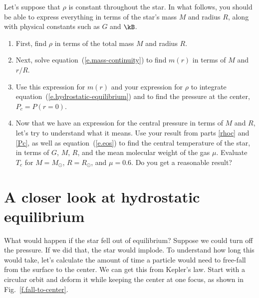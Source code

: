 \begin{exercisebox}
\label{ex.constant-density-star}
Let's suppose that $\rho$ is constant throughout the star. 
In what follows, you should be able to express everything in terms of the star's mass $M$ and radius $R$, along with physical constants such as $G$ and $\kB$.

\begin{enumerate}
\item\label{rhoc} First, find $\rho$ in terms of the total mass $M$ and radius $R$.

\item Next, solve equation~(\ref{e.mass-continuity}) to find $m(r)$ in terms of $M$ and $r/R$.

\item\label{Pc} Use this expression for $m(r)$ and your expression for $\rho$ to integrate equation~(\ref{e.hydrostatic-equilibrium}) and to find the pressure at the center, $P_{c} = P(r=0)$.

\item
Now that we have an expression for the central pressure in terms of $M$ and $R$, let's try to understand what it means. Use your result from parts \ref{rhoc} and \ref{Pc}, as well as equation~(\ref{e.eos}) to find the central temperature of the star, in terms of $G$, $M$, $R$, and the mean molecular weight of the gas $\mu$.  Evaluate $T_{c}$ for $M=M_{\odot}$, $R=R_{\odot}$, and $\mu = 0.6$.  Do you get a reasonable result?
\end{enumerate}
\end{exercisebox}

\section{A closer look at hydrostatic equilibrium}
\label{s.closer-look}

What would happen if the star fell out of equilibrium? Suppose we could turn off the pressure. If we did that, the star would implode. To understand how long this would take, let's calculate the amount of time a particle would need to free-fall from the surface to the center.  We can get this from Kepler's law. Start with a circular orbit and deform it while keeping the center at one focus, as shown in Fig.~\ref{f.fall-to-center}.  

